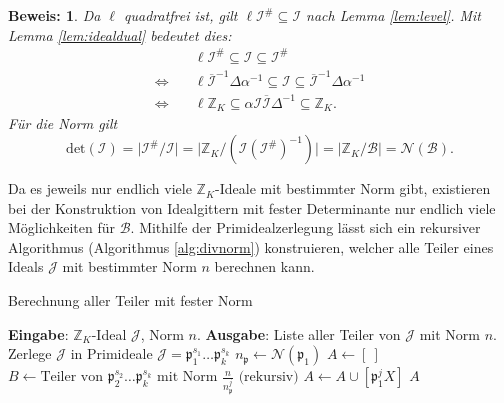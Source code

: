 \documentclass[12pt,a4paper,halfparskip,headsepline,bibtotocnumbered]{scrreprt}
\theoremstyle{nummermitklammern}
\theoremstyle{nonumberbreak}
\newtheorem{beweis}{Beweis:}
\newcommand{\Z}{\mathbb{Z}}
\newcommand{\B}{\mathcal{B}}
\newcommand{\No}{\mathcal{N}}
\newcommand{\I}{\mathcal{I}}
\newcommand{\J}{\mathcal{J}}
\newcommand{\p}{\mathfrak{p}}
\begin{document}
\begin{beweis}
	Da $\ell$ quadratfrei ist, gilt $\ell \I^\# \subseteq \I$ nach Lemma \eqref{lem:level}. Mit Lemma \eqref{lem:idealdual} bedeutet dies:
	\begin{align*}
		&\ell \I^\# \subseteq \I \subseteq \I^\#\\
		\Leftrightarrow\quad& \ell \overline{\I}^{-1} \Delta \alpha^{-1} \subseteq \I \subseteq \overline{\I}^{-1} \Delta \alpha^{-1}\\
		\Leftrightarrow\quad& \ell \Z_K \subseteq \alpha \I \overline{\I} \Delta^{-1} \subseteq \Z_K.
	\end{align*}
	Für die Norm gilt
	\begin{equation*}
		\text{det}(\I) = \vert \I^\# / \I \vert = \vert \Z_K / \left(\I\left(\I^\#\right)^{-1}\right) \vert = \vert \Z_K / \B \vert = \No(\B).
	\end{equation*}
\end{beweis}

Da es jeweils nur endlich viele $\Z_K$-Ideale mit bestimmter Norm gibt, existieren bei der Konstruktion von Idealgittern mit fester Determinante nur endlich viele Möglichkeiten für $\B$. Mithilfe der Primidealzerlegung lässt sich ein rekursiver Algorithmus (Algorithmus \eqref{alg:divnorm}) konstruieren, welcher alle Teiler eines Ideals $\J$ mit bestimmter Norm $n$ berechnen kann.

\begin{algorithm}
	\caption{Berechnung aller Teiler mit fester Norm}\label{alg:divnorm}
	\begin{algorithmic}[1]
		\State \textbf{Eingabe}: $\Z_K$-Ideal $\J$, Norm $n$.
		\State \textbf{Ausgabe}: Liste aller Teiler von $\J$ mit Norm $n$.
		\\
		 \Return {$\left[ \Z_K \right]$} \EndIf
		\If {$n \nmid \No(\J))$} \Return {$\left[ \ \right]$} \EndIf
		\If {$\No(\J) = n$} \Return {$\left[ \J \right]$} \EndIf
		\State Zerlege $\J$ in Primideale $\J = \p_1^{s_1} \dots \p_k^{s_k}$
		\State $n_\p \gets \No(\p_1)$
		\State $A \gets \left[ \ \right]$
			\If {$n_\p^j \mid n$}
				\State $B \gets \text{Teiler von } \p_2^{s_2} \dots \p_k^{s_k} \text{ mit Norm } \frac{n}{n_\p^j} \text{ (rekursiv)}$
					\State $A \gets A \cup \left[\p_1^j X \right]$
				\EndFor
			\EndIf
		\EndFor
		\State \Return $A$
	\end{algorithmic}
\end{algorithm}
\end{document}
